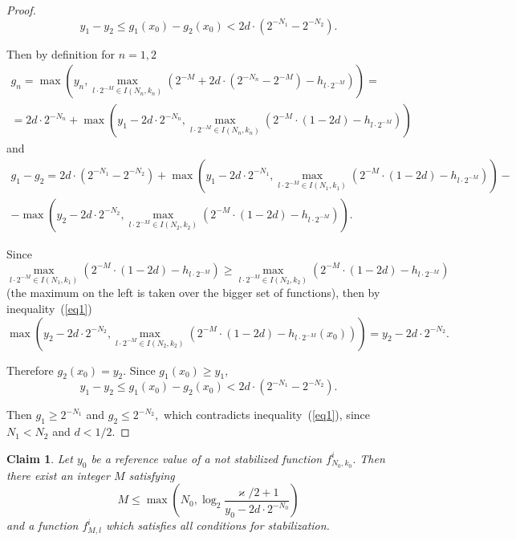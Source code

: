 \documentclass[12pt]{article}
\newtheorem{clai}[prop]{Claim}
\theoremstyle{definition}
\begin{document}
\begin{proof}
$$
y_1 - y_2 \le g_1(x_0) - g_2(x_0) < 2d\cdot\left(2^{-N_1}-2^{-N_2}\right).
$$

\smallskip
{}

Then by definition for $n=1,2$
\begin{multline*}
g_n = \max\left( y_n, \max\limits_{l\cdot2^{-M}\in I(N_n,k_n)}\left( 2^{-M} + 2d\cdot\left(2^{-N_n} - 2^{-M}\right) - h_{l\cdot2^{-M}} \right) \right) = \\
= 2d\cdot2^{-N_n} + \max\left( y_1 - 2d\cdot2^{-N_n}, \max\limits_{l\cdot2^{-M}\in I(N_n,k_n)}\left( 2^{-M}\cdot(1-2d) - h_{l\cdot2^{-M}} \right) \right)
\end{multline*}
and
\begin{multline*}
g_1 - g_2 = 2d\cdot\left(2^{-N_1}-2^{-N_2}\right) + \max\left( y_1 - 2d\cdot2^{-N_1}, \max\limits_{l\cdot2^{-M}\in I(N_1,k_1)}\left( 2^{-M}\cdot(1-2d) - h_{l\cdot2^{-M}} \right) \right) - \\
- \max\left( y_2 - 2d\cdot2^{-N_2}, \max\limits_{l\cdot2^{-M}\in I(N_2,k_2)}\left( 2^{-M}\cdot(1-2d) - h_{l\cdot2^{-M}} \right) \right).
\end{multline*}

Since
$$
\max\limits_{l\cdot2^{-M}\in I(N_1,k_1)}\left( 2^{-M}\cdot(1-2d) - h_{l\cdot2^{-M}} \right) \ge
\max\limits_{l\cdot2^{-M}\in I(N_2,k_2)}\left( 2^{-M}\cdot(1-2d) - h_{l\cdot2^{-M}} \right)
$$
(the maximum on the left is taken over the bigger set of functions), then by inequality~(\ref{eq1})
$$
\max\left( y_2 - 2d\cdot2^{-N_2}, \max\limits_{l\cdot2^{-M}\in I(N_2,k_2)}\left( 2^{-M}\cdot(1-2d) - h_{l\cdot2^{-M}}(x_0) \right) \right) = y_2 - 2d\cdot2^{-N_2}.
$$

Therefore $g_2(x_0) = y_2.$ Since $g_1(x_0)\ge y_1,$
$$
y_1 - y_2 \le g_1(x_0) - g_2(x_0) < 2d\cdot\left(2^{-N_1}-2^{-N_2}\right).
$$


\smallskip
{} Then $g_1 \ge 2^{-N_1}$ and $g_2 \le 2^{-N_2},$ which contradicts inequality~(\ref{eq1}), since $N_1 < N_2$ and $d<1/2.$
\end{proof}

\begin{clai}
\label{existence-of-stabilizable}
Let $y_0$ be a reference value of a not stabilized function $f_{N_0,k_0}^i.$ Then there exist an integer $M$ satisfying
$$
M \le \max\left(N_0, \log_2\frac{\varkappa/2 + 1}{y_0 - 2d\cdot2^{-N_0}}\right)
$$
and a function $f_{M,l}^i$ which satisfies all conditions for stabilization.
\end{clai}
\end{document}
